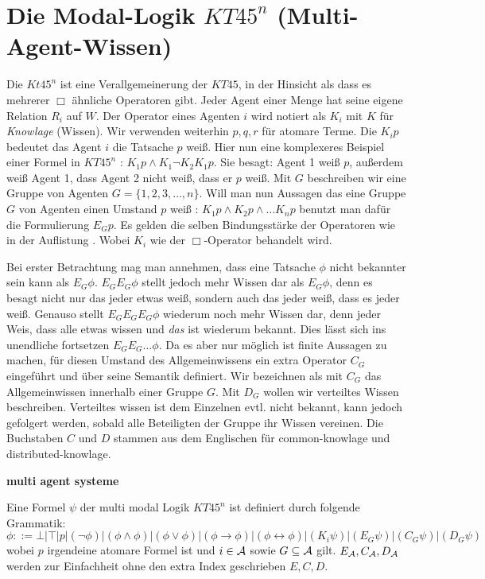 
\section{Die Modal-Logik $KT45^n$ (Multi-Agent-Wissen)} %
\label{sub:the_modal_logic_kt45_n_}

Die \MML $Kt45^n$ ist eine Verallgemeinerung der \ML $KT45$, in der Hinsicht als dass es mehrerer $\Box$ ähnliche Operatoren gibt.
Jeder Agent einer Menge \AgentSetDef hat seine eigene Relation $R_i$ auf $W$.
Der Operator eines Agenten $i$ wird notiert als $K_i$ mit $K$ für \emph{Knowlage} (Wissen).
Wir verwenden weiterhin $p,q,r$ für atomare Terme.
Die $K_ip$ bedeutet das Agent $i$ die Tatsache $p$ weiß.
Hier nun eine komplexeres Beispiel einer Formel in $KT45^n$ : $K_1p \wedge K_1 \neg K_2 K_1 p$.
Sie besagt: Agent 1 weiß $p$, außerdem weiß Agent 1, dass Agent 2 nicht weiß, dass er $p$ weiß.
Mit $G$ beschreiben wir eine Gruppe von Agenten $G= \{1,2,3,\dots,n\}$.
Will man nun Aussagen das eine Gruppe $G$ von Agenten einen Umstand $p$ weiß : $K_1 p \wedge K_2 p \wedge \dots K_n p$ benutzt man dafür die Formulierung $E_G p$.
Es gelden die selben Bindungsstärke der Operatoren wie in der Auflistung .
Wobei $K_i$ wie der $\Box$-Operator behandelt wird.


Bei erster Betrachtung mag man annehmen, dass eine Tatsache $\phi$ nicht bekannter sein kann als $E_G \phi$.
$E_G E_G \phi$ stellt jedoch mehr Wissen dar als $E_G \phi$, denn es besagt nicht nur das jeder etwas weiß, sondern auch das jeder weiß, dass es jeder weiß.
Genauso stellt $E_G E_G E_G \phi$ wiederum noch mehr Wissen dar, denn jeder Weis, dass alle etwas wissen und \emph{das} ist wiederum bekannt.
Dies lässt sich ins unendliche fortsetzen $E_G E_G \dots \phi$.
Da es aber nur möglich ist finite Aussagen zu machen, für diesen Umstand des Allgemeinwissens ein extra Operator $C_G$ eingeführt und über seine Semantik definiert.
Wir bezeichnen als mit $C_G$ das Allgemeinwissen innerhalb einer Gruppe $G$.
Mit $D_G$ wollen wir verteiltes Wissen beschreiben.
Verteiltes wissen ist dem Einzelnen evtl. nicht bekannt, kann jedoch gefolgert werden, sobald alle Beteiligten der Gruppe ihr Wissen vereinen.
Die Buchstaben $C$ und $D$ stammen aus dem Englischen für common-knowlage und distributed-knowlage.

\textbf{multi agent systeme}
\begin{definition}
	\label{def:bnf_kt45n}
	Eine Formel $\psi$ der multi modal Logik $KT45^n$ ist definiert durch folgende Grammatik:
	\begin{equation}
		\label{eqn:bnf_kt45n}
		\phi ::= \bot|\top|p|(\neg\phi)|(\phi\wedge\phi)|(\phi\vee\phi)|(\phi\rightarrow\phi)|
		(\phi\leftrightarrow\phi)|(K_i\psi)|(E_G\psi)|(C_G\psi)|(D_G\psi)
	\end{equation}
	wobei $p$ irgendeine atomare Formel ist und $i \in \mathcal{A}$ sowie $G \subseteq \mathcal{A}$ gilt.
	$E_{\mathcal{A}}, C_{\mathcal{A}}, D_{\mathcal{A}}$ werden zur Einfachheit ohne den extra Index geschrieben $E,C,D$.
\end{definition}


